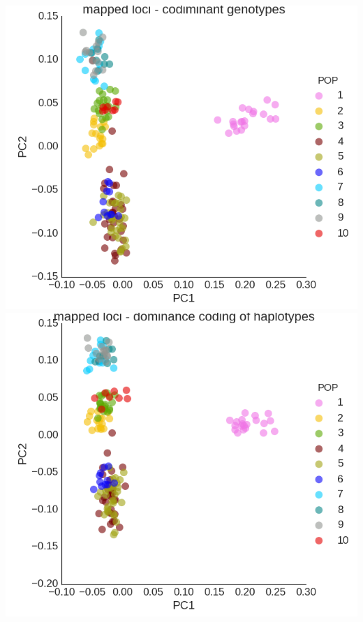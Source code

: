 \documentclass[12pt, one column]{article}
\begin{document}
\includegraphics[scale=.3]{figures/PCA_codom.png}
\includegraphics[scale=.3]{figures/PCA_dom.png}
\end{document}
